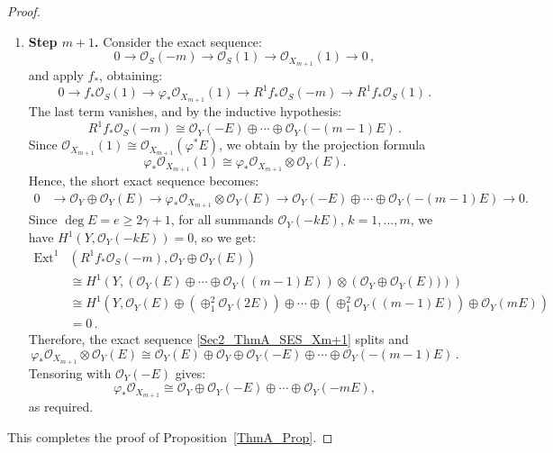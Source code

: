 \documentclass[a4paper,12pt]{amsart}
\def\Ext{\operatorname{Ext}}%
\begin{document}
\begin{proof}
\begin{enumerate}[label=(\arabic*), leftmargin=*, font=\rmfamily]
\item \textbf{Step $m+1$.}
Consider the exact sequence:
\[
 0 \to \mathcal{O}_S (-m)  \to \mathcal{O}_S(1) \to \mathcal{O}_{X_{m+1}} (1) \to 0 \, ,
\]
and apply $f_{\ast}$, obtaining:
\[
 0 \to f_{\ast} \mathcal{O}_S(1) \to \varphi_{\ast} \mathcal{O}_{X_{m+1}} (1) \to R^1 f_{\ast} \mathcal{O}_S (-m) \to R^1 f_{\ast} \mathcal{O}_S (1) \, .
\]
The last term vanishes,  and by the inductive hypothesis:
\[
 R^1 f_{\ast} \mathcal{O}_S (-m) \cong \mathcal{O}_Y (-E) \oplus \cdots \oplus \mathcal{O}_Y (-(m-1)E) \, .
\]
Since $\mathcal{O}_{X_{m+1}} (1) \cong \mathcal{O}_{X_{m+1}} (\varphi^{\ast} E)$, we obtain by the projection formula
\[
 \varphi_{\ast} \mathcal{O}_{X_{m+1}} (1) \cong \varphi_{\ast} \mathcal{O}_{X_{m+1}} \otimes  \mathcal{O}_Y (E).
\]
Hence, the short exact sequence becomes:
\begin{equation}\label{Sec2_ThmA_SES_Xm+1}
 \begin{aligned}
  0 & \to \mathcal{O}_Y \oplus \mathcal{O}_Y (E) \to \varphi_{\ast} \mathcal{O}_{X_{m+1}} \otimes \mathcal{O}_Y (E)
  \to \mathcal{O}_Y (-E) \oplus \cdots \oplus \mathcal{O}_Y (-(m-1)E) \to 0 .
 \end{aligned}
\end{equation}
Since $\deg E = e \geq 2\gamma+1$, for all summands $\mathcal{O}_Y (-kE)$, $k = 1, \ldots , m$, we have $H^1 (Y, \mathcal{O}_Y (-kE)) = 0$, so we get:
\[
\begin{aligned}
 \Ext^1 & (R^1 f_{\ast} \mathcal{O}_S (-m), \mathcal{O}_Y \oplus \mathcal{O}_Y (E)) \\
 & \cong
 H^1 (Y, \left( \mathcal{O}_Y (E) \oplus \cdots \oplus \mathcal{O}_Y ((m-1)E) \right) \otimes \left( \mathcal{O}_Y \oplus \mathcal{O}_Y (E)) \right)) \\
 & \cong
 H^1 \left(Y,  \mathcal{O}_Y (E) \oplus ( \oplus^2_1 \mathcal{O}_Y (2E)) \oplus \cdots \oplus (\oplus^2_1 \mathcal{O}_Y ((m-1)E)  ) \oplus \mathcal{O}_Y (mE) \right) \\
 & = 0 \, .
\end{aligned}
\]
Therefore, the exact sequence \eqref{Sec2_ThmA_SES_Xm+1} splits and
\[
 \varphi_{\ast} \mathcal{O}_{X_{m+1}} \otimes \mathcal{O}_Y (E) \cong
 \mathcal{O}_Y (E) \oplus \mathcal{O}_Y \oplus \mathcal{O}_Y (-E) \oplus \cdots \oplus \mathcal{O}_Y (-(m-1)E) \, .
\]
Tensoring with $\mathcal{O}_Y (-E)$ gives:
\[
 \varphi_{\ast} \mathcal{O}_{X_{m+1}} \cong
 \mathcal{O}_Y \oplus \mathcal{O}_Y (-E) \oplus \cdots \oplus \mathcal{O}_Y (-mE),
\]
as required.
\end{enumerate}
This completes the proof of \textnormal{Proposition~\ref{ThmA_Prop}}.

\end{proof}
\end{document}
